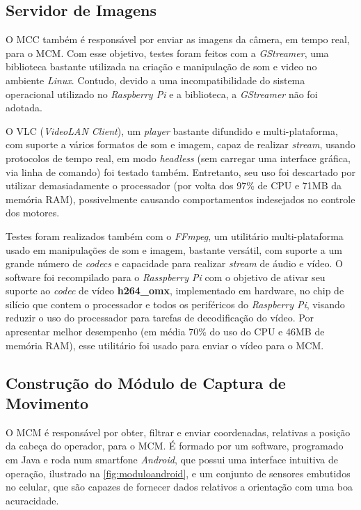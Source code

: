 \subsection{Servidor de Imagens}
\label{subsec:mediaserver}

O MCC também é responsável por enviar as imagens da câmera, em tempo real, para o MCM. Com esse objetivo, testes foram feitos com a \textit{GStreamer}, uma biblioteca bastante utilizada na criação e manipulação de som e video no ambiente \textit{Linux}. Contudo, devido a uma incompatibilidade do sistema operacional utilizado no \textit{Raspberry Pi} e a biblioteca, a \textit{GStreamer} não foi adotada.\par

O VLC (\textit{VideoLAN Client}), um \textit{player} bastante difundido e multi-plataforma, com suporte a vários formatos de som e imagem, capaz de realizar \textit{stream}, usando protocolos de tempo real, em modo \textit{headless} (sem carregar uma interface gráfica, via linha de comando) foi testado também. Entretanto, seu uso foi descartado por utilizar demasiadamente o processador (por volta dos 97\% de CPU e 71MB da memória RAM), possivelmente causando comportamentos indesejados no controle dos motores.\par

Testes foram realizados também com o \textit{FFmpeg}, um utilitário multi-plataforma usado em manipulações de som e imagem, bastante versátil, com suporte a um grande número de \textit{codecs} e capacidade para realizar \textit{stream} de áudio e vídeo. O software foi recompilado para o \textit{Rasspberry Pi} com o objetivo de ativar seu suporte ao \textit{codec} de vídeo \textbf{h264\_omx}, implementado em hardware, no chip de silício que contem o processador e todos os periféricos do \textit{Raspberry Pi}, visando reduzir o uso do processador para tarefas de decodificação do vídeo. Por apresentar melhor desempenho (em média 70\% do uso do CPU e 46MB de memória RAM), esse utilitário foi usado para enviar o vídeo para o MCM.



\subsection{Construção do Módulo de Captura de Movimento}
\label{subsec:assemmodcapmov}

O MCM é responsável por obter, filtrar e enviar coordenadas, relativas a posição da cabeça do operador, para o MCM. É formado por um software, programado em Java e roda num smartfone \textit{Android}, que possui uma interface intuitiva de operação, ilustrado na \autoref{fig:moduloandroid}, e um conjunto de sensores embutidos no celular, que são capazes de fornecer dados relativos a orientação com uma boa acuracidade. \par

